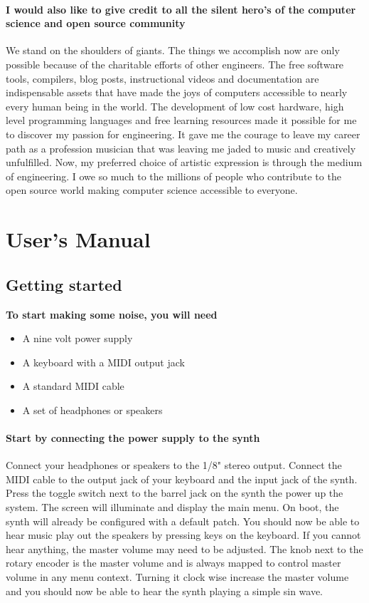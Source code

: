 \documentclass[acmlarge,screen]{acmart}
\begin{document}
	\paragraph{I would also like to give credit to all the silent hero's of the computer science and open source community} We stand on the shoulders of giants. The things we accomplish now are only possible because of the charitable efforts of other engineers. The free software tools, compilers, blog posts, instructional videos and documentation are indispensable assets that have made the joys of computers accessible to nearly every human being in the world. The development of low cost hardware, high level programming languages and free learning resources made it possible for me to discover my passion for engineering. It gave me the courage to leave my career path as a profession musician that was leaving me jaded to music and creatively unfulfilled. Now, my preferred choice of artistic expression is through the medium of engineering. I owe so much to the millions of people who contribute to the open source world making computer science accessible to everyone.






\appendix

\section{User's Manual}
\subsection{Getting started}
\textbf{To start making some noise, you will need}
\begin{itemize}
	\item A nine volt power supply
	\item A keyboard with a MIDI output jack
	\item A standard MIDI cable
	\item A set of headphones or speakers
\end{itemize}
\paragraph{Start by connecting the power supply to the synth} Connect your headphones or speakers to the 1/8" stereo output. Connect the MIDI cable to the output jack of your keyboard and the input jack of the synth. Press the toggle switch next to the barrel jack on the synth the power up the system. The screen will illuminate and display the main menu. On boot, the synth will already be configured with a default patch. You should now be able to hear music play out the speakers by pressing keys on the keyboard. If you cannot hear anything, the master volume may need to be adjusted. The knob next to the rotary encoder is the master volume and is always mapped to control master volume in any menu context. Turning it clock wise increase the master volume and you should now be able to hear the synth playing a simple sin wave.
\end{document}
